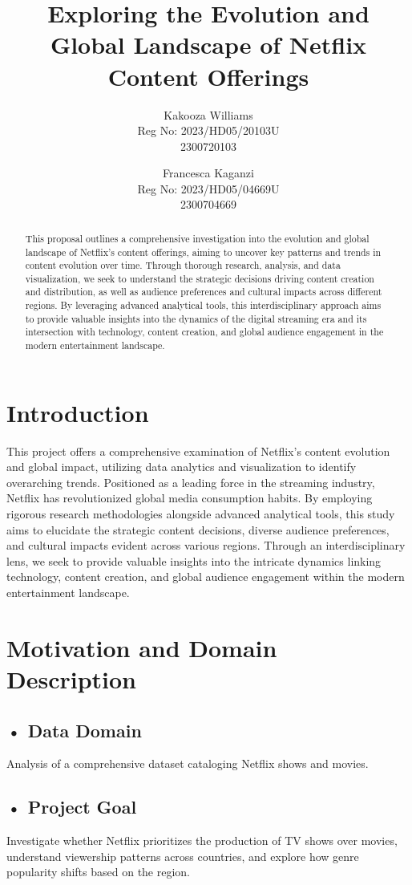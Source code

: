 \documentclass[12pt]{article}
\title{Exploring the Evolution and Global Landscape of Netflix Content Offerings}
\author{Kakooza Williams\\Reg No: 2023/HD05/20103U \\ 2300720103\and Francesca Kaganzi
\\Reg No: 2023/HD05/04669U\\ 2300704669
}
\begin{document}
\maketitle


\begin{abstract} 
This proposal outlines a comprehensive investigation into the evolution and global landscape of Netflix's content offerings, aiming to uncover key patterns and trends in content evolution over time. Through thorough research, analysis, and data visualization, we seek to understand the strategic decisions driving content creation and distribution, as well as audience preferences and cultural impacts across different regions. By leveraging advanced analytical tools, this interdisciplinary approach aims to provide valuable insights into the dynamics of the digital streaming era and its intersection with technology, content creation, and global audience engagement in the modern entertainment landscape.
\end{abstract}

\section{Introduction}

This project offers a comprehensive examination of Netflix's content evolution and global impact, utilizing data analytics and visualization to identify overarching trends. Positioned as a leading force in the streaming industry, Netflix has revolutionized global media consumption habits. By employing rigorous research methodologies alongside advanced analytical tools, this study aims to elucidate the strategic content decisions, diverse audience preferences, and cultural impacts evident across various regions. Through an interdisciplinary lens, we seek to provide valuable insights into the intricate dynamics linking technology, content creation, and global audience engagement within the modern entertainment landscape.

\section{Motivation and Domain Description}
\subsection{•	Data Domain}
Analysis of a comprehensive dataset cataloging Netflix shows and movies.
\subsection{•	Project Goal}
Investigate whether Netflix prioritizes the production of TV shows over movies, understand viewership patterns across countries, and explore how genre popularity shifts based on the region.
\end{document}
